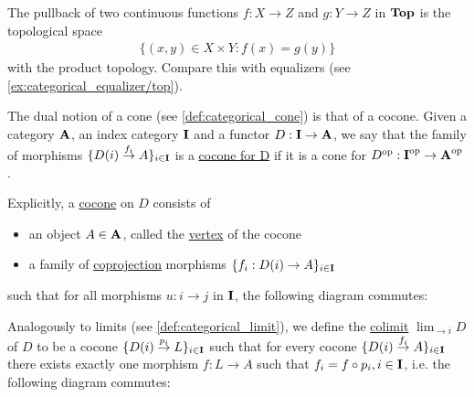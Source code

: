 \begin{example}\label{ex:categorical_pullback/top}
  The pullback of two continuous functions $f: X \to Z$ and $g: Y \to Z$ in $\operatorname{\mathbf{Top}}$ is the topological space
  \begin{align*}
    \{ (x, y) \in X \times Y \colon f(x) = g(y) \}
  \end{align*}
  with the product topology. Compare this with equalizers (see \cref{ex:categorical_equalizer/top}).
\end{example}

\begin{definition}\label{def:categorical_cocone}\cite[definition 5.2.1]{Leinster2014}
  The dual notion of a cone (see \cref{def:categorical_cone}) is that of a cocone. Given a category $\operatorname{\mathbf{A}}$, an index category $\operatorname{\mathbf{I}}$ and a functor $D: \operatorname{\mathbf{I}} \to \operatorname{\mathbf{A}}$, we say that the family of morphisms $\{ D(i) \overset {f_i} \to A \}_{i \in \operatorname{\mathbf{I}}}$ is a \uline{cocone for D} if it is a cone for $D^{\operatorname{op}}: \operatorname{\mathbf{I}}^{\operatorname{op}} \to \operatorname{\mathbf{A}}^{\operatorname{op}}$.

  Explicitly, a \uline{cocone} on $D$ consists of
  \begin{itemize}
    \item an object $A \in \operatorname{\mathbf{A}}$, called the \uline{vertex} of the cocone
    \item a family of \uline{coprojection} morphisms $\{ f_i: D(i) \to A \}_{i \in \operatorname{\mathbf{I}}}$
  \end{itemize}
  such that for all morphisms $u: i \to j$ in $\operatorname{\mathbf{I}}$, the following diagram commutes:
  \begin{center}
  \end{center}
\end{definition}

\begin{definition}\label{def:categorical_colimit}\cite[definition 5.1.19(b)]{Leinster2014}
  Analogously to limits (see \cref{def:categorical_limit}), we define the \uline{colimit} $\displaystyle\lim_{\to i} D$ of $D$ to be a cocone $\{ D(i) \overset {p_i} \to L \}_{i \in \operatorname{\mathbf{I}}}$ such that for every cocone $\{ D(i) \overset {f_i} \to A \}_{i \in \operatorname{\mathbf{I}}}$ there exists exactly one morphism $f: L \to A$ such that $f_i = f \circ p_i, i \in \operatorname{\mathbf{I}}$, i.e. the following diagram commutes:
  \begin{center}
  \end{center}
\end{definition}

